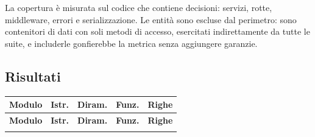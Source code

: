 La copertura è misurata sul codice che contiene decisioni: servizi, rotte,
middleware, errori e serializzazione. Le entità sono escluse dal perimetro:
sono contenitori di dati con soli metodi di accesso, esercitati indirettamente
da tutte le suite, e includerle gonfierebbe la metrica senza aggiungere
garanzie.

\subsection{Risultati}

\begin{longtable}{@{}L{7.6cm} r r r r@{}}
\toprule
\textbf{Modulo} & \textbf{Istr.} & \textbf{Diram.} & \textbf{Funz.} & \textbf{Righe} \\
\midrule
\endfirsthead
\toprule
\textbf{Modulo} & \textbf{Istr.} & \textbf{Diram.} & \textbf{Funz.} & \textbf{Righe} \\
\midrule
\endhead
\bottomrule
\endlastfoot


\end{longtable}
